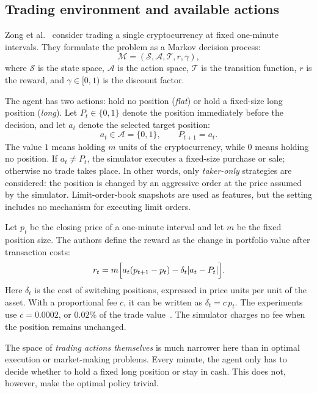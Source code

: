 \documentclass[9pt,a4paper,twocolumn]{extarticle}
\begin{document}
\subsection{Trading environment and available actions}

Zong et al.~\cite{zong2024macrohft} consider trading a single cryptocurrency at fixed one-minute
intervals. They formulate the problem as a Markov decision process:
\begin{equation}
  \mathcal{M}
  =(\mathcal{S},\mathcal{A},\mathcal{T},r,\gamma),
  \label{eq:mdp}
\end{equation}
where $\mathcal{S}$ is the state space, $\mathcal{A}$ is the action space, $\mathcal{T}$ is the
transition function, $r$ is the reward, and $\gamma\in[0,1)$ is the discount factor.

The agent has two actions: hold no position (\emph{flat}) or hold a fixed-size long position
(\emph{long}). Let $P_t\in\{0,1\}$ denote the position immediately before the decision, and let
$a_t$ denote the selected target position:
\begin{equation}
  a_t\in\mathcal{A}=\{0,1\},
  \qquad P_{t+1}=a_t.
  \label{eq:action}
\end{equation}
The value $1$ means holding $m$ units of the cryptocurrency, while $0$ means holding no position.
If $a_t\ne P_t$, the simulator executes a fixed-size purchase or sale; otherwise no trade takes
place. In other words, only \emph{taker-only} strategies are considered: the position is changed
by an aggressive order at the price assumed by the simulator. Limit-order-book snapshots are
used as features, but the setting includes no mechanism for executing limit orders.

Let $p_t$ be the closing price of a one-minute interval and let $m$ be the fixed position size.
The authors define the reward as the change in portfolio value after transaction costs:
\begin{equation}
  r_t=m\Bigl[
    a_t(p_{t+1}-p_t)
    -\delta_t\lvert a_t-P_t\rvert
  \Bigr].
  \label{eq:reward}
\end{equation}
Here $\delta_t$ is the cost of switching positions, expressed in price units per unit of the
asset. With a proportional fee $c$, it can be written as $\delta_t=c\,p_t$. The experiments use
$c=0.0002$, or $0.02\%$ of the trade value~\cite{zong2024macrohft}. The simulator charges no fee
when the position remains unchanged.

The space of \emph{trading actions themselves} is much narrower here than in optimal execution
or market-making problems. Every minute, the agent only has to decide whether to hold a fixed
long position or stay in cash. This does not, however, make the optimal policy trivial.
\end{document}
